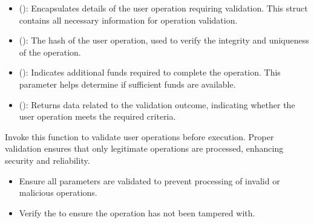 \documentclass[letterpaper,10pt,english]{sphinxmanual}
\begin{document}
\sphinxAtStartPar
{}
\begin{itemize}
\item {} 
\sphinxAtStartPar
{} ():
Encapsulates details of the user operation requiring validation. This struct contains all necessary information for operation validation.

\item {} 
\sphinxAtStartPar
{} ():
The hash of the user operation, used to verify the integrity and uniqueness of the operation.

\item {} 
\sphinxAtStartPar
{} ():
Indicates additional funds required to complete the operation. This parameter helps determine if sufficient funds are available.

\end{itemize}

\sphinxAtStartPar
{}
\begin{itemize}
\item {} 
\sphinxAtStartPar
{} ():
Returns data related to the validation outcome, indicating whether the user operation meets the required criteria.

\end{itemize}

\sphinxAtStartPar
{}

\sphinxAtStartPar
Invoke this function to validate user operations before execution. Proper validation ensures that only legitimate operations are processed, enhancing security and reliability.

\sphinxAtStartPar
{}
\begin{itemize}
\item {} 
\sphinxAtStartPar
{} Ensure all parameters are validated to prevent processing of invalid or malicious operations.

\item {} 
\sphinxAtStartPar
{} Verify the  to ensure the operation has not been tampered with.

\end{itemize}
\end{document}
